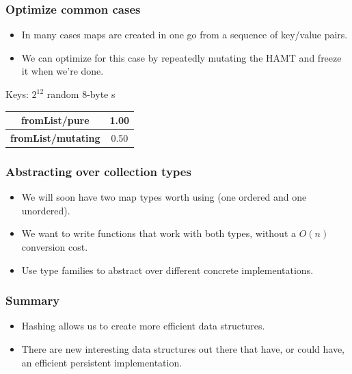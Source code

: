 \documentclass[xetex,mathserif,serif]{beamer}
\newcommand{\code}[1]{\mbox{\texttt{\small{\color{CodeColor}{#1}}}}}
\begin{document}
\begin{frame}
  \frametitle{Optimize common cases}
  \begin{itemize}
  \item In many cases maps are created in one go from a sequence of
    key/value pairs.
  \item We can optimize for this case by repeatedly mutating the HAMT
    and freeze it when we're done.
  \end{itemize}

  \bigskip
  Keys: $2^{12}$ random 8-byte \code{ByteString}s

  \bigskip
  \begin{tabular}{|c|c|}
    \hline \textbf{fromList/pure} & 1.00 \\
    \hline \textbf{fromList/mutating} & 0.50 \\
    \hline
  \end{tabular}
\end{frame}

\begin{frame}
  \frametitle{Abstracting over collection types}
  \begin{itemize}
  \item We will soon have two map types worth using (one ordered and one
    unordered).
  \item We want to write functions that work with both types, without a
    $O(n)$ conversion cost.
  \item Use type families to abstract over different concrete
    implementations.
  \end{itemize}
\end{frame}

\begin{frame}
  \frametitle{Summary}
  \begin{itemize}
  \item Hashing allows us to create more efficient data structures.
  \item There are new interesting data structures out there that have,
    or could have, an efficient persistent implementation.
  \end{itemize}
\end{frame}
\end{document}
